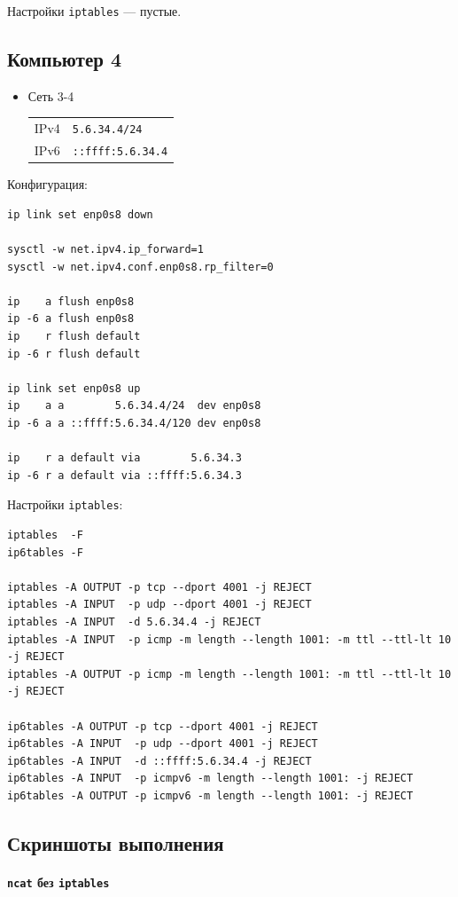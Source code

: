 Настройки \texttt{iptables} --- пустые.

\subsection{Компьютер 4}
\begin{itemize}
    \item Сеть 3-4

    \begin{tabular}{ll}
        IPv4 & \texttt{5.6.34.4/24}     \\
        IPv6 & \texttt{::ffff:5.6.34.4} \\
    \end{tabular}
\end{itemize}

Конфигурация:
\begin{verbatim}
ip link set enp0s8 down

sysctl -w net.ipv4.ip_forward=1
sysctl -w net.ipv4.conf.enp0s8.rp_filter=0

ip    a flush enp0s8
ip -6 a flush enp0s8
ip    r flush default
ip -6 r flush default

ip link set enp0s8 up
ip    a a        5.6.34.4/24  dev enp0s8
ip -6 a a ::ffff:5.6.34.4/120 dev enp0s8

ip    r a default via        5.6.34.3
ip -6 r a default via ::ffff:5.6.34.3
\end{verbatim}

Настройки \texttt{iptables}:
\begin{verbatim}
iptables  -F
ip6tables -F

iptables -A OUTPUT -p tcp --dport 4001 -j REJECT
iptables -A INPUT  -p udp --dport 4001 -j REJECT
iptables -A INPUT  -d 5.6.34.4 -j REJECT
iptables -A INPUT  -p icmp -m length --length 1001: -m ttl --ttl-lt 10 -j REJECT
iptables -A OUTPUT -p icmp -m length --length 1001: -m ttl --ttl-lt 10 -j REJECT

ip6tables -A OUTPUT -p tcp --dport 4001 -j REJECT
ip6tables -A INPUT  -p udp --dport 4001 -j REJECT
ip6tables -A INPUT  -d ::ffff:5.6.34.4 -j REJECT
ip6tables -A INPUT  -p icmpv6 -m length --length 1001: -j REJECT
ip6tables -A OUTPUT -p icmpv6 -m length --length 1001: -j REJECT
\end{verbatim}

\subsection{Скриншоты выполнения}
\paragraph{\texttt{ncat} без \texttt{iptables}}

